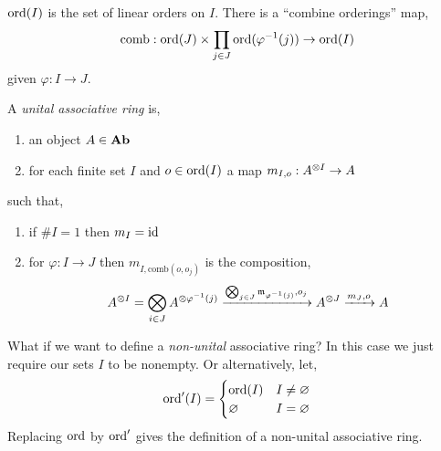 \documentclass[12pt]{article}
\begin{document}
\newcommand{\comb}{\mathrm{comb}}
\newcommand{\comp}{\mathrm{comp}}

\begin{defn}
$\operatorname{\mathrm{ord}}(I)$ is the set of linear orders on $I$. There is a ``combine orderings'' map,
\[ \comb : \ord(J) \times \prod_{j \in J} \ord(\varphi^{-1}(j)) \to \ord(I) \]
given $\varphi : I \to J$.
\end{defn}

\begin{defn}
A \textit{unital associative ring} is,
\begin{enumerate}
\item an object $A \in \mathbf{Ab}$
\item for each finite set $I$ and $o \in \operatorname{\mathrm{ord}}(I)$ a map $m_{I,o} : A^{\otimes I} \to A$
\end{enumerate}
such that,
\begin{enumerate}
\item if $\# I = 1$ then $m_I = \mathrm{id}$
\item for $\varphi : I \to J$ then $m_{I, \comb(o, o_j)}$ is the composition,
\[ A^{\otimes I} = \bigotimes_{i \in J} A^{\otimes \varphi^{-1}(j)} \xrightarrow{\bigotimes_{j \in J} \mathfrak{m}_{\varphi^{-1}(j)}, o_j} A^{\otimes J} \xrightarrow{m_J, o} A \]
\end{enumerate}
\end{defn}

\begin{rmk}
What if we want to define a \textit{non-unital} associative ring? In this case we just require our sets $I$ to be nonempty. Or alternatively, let,
\[ \operatorname{\mathrm{ord}}'(I) = 
\begin{cases}
\operatorname{\mathrm{ord}}(I) & I \neq \varnothing 
\\
\varnothing & I = \varnothing 
\end{cases}\]
Replacing $\operatorname{\mathrm{ord}}$ by $\operatorname{\mathrm{ord}}'$ gives the definition of a non-unital associative ring. 
\end{rmk}
\end{document}

